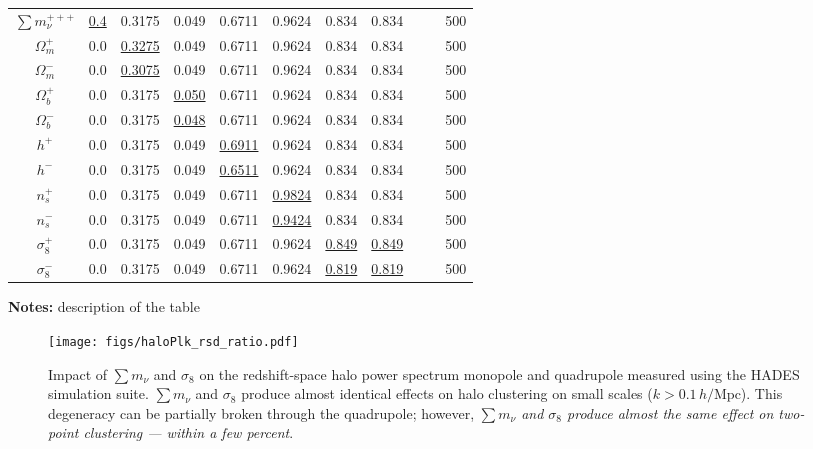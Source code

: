\documentclass[12pt, letterpaper, preprint]{aastex62}
\newcommand{\smnu}{\sum m_\nu}
\newcommand{\sig}{\sigma_8}
\newcommand{\hmpc}{\,h/\mathrm{Mpc}}
\newcommand{\ch}[1]{{\color{orange}{\bf CH:} #1}}
\begin{document}
\begin{table}
\begin{center}
\begin{tabular}{ccccccccccc}
    $\smnu^{+++}$   & \underline{0.4}   & 0.3175 & 0.049 & 0.6711 & 0.9624 & 0.834 & 0.834 & & & 500 \\ 
    $\Omega_m^+$    & 0.0   & \underline{ 0.3275} & 0.049 & 0.6711 & 0.9624 & 0.834 & 0.834 & & & 500 \\ 
    $\Omega_m^-$    & 0.0   & \underline{ 0.3075} & 0.049 & 0.6711 & 0.9624 & 0.834 & 0.834 & & & 500 \\ 
    $\Omega_b^+$    & 0.0   & 0.3175 & \underline{0.050} & 0.6711 & 0.9624 & 0.834 & 0.834 & & & 500 \\ 
    $\Omega_b^-$    & 0.0   & 0.3175 & \underline{0.048} & 0.6711 & 0.9624 & 0.834 & 0.834 & & & 500 \\ 
    $h^+$           & 0.0   & 0.3175 & 0.049 & \underline{0.6911} & 0.9624 & 0.834 & 0.834 & & & 500 \\ 
    $h^-$           & 0.0   & 0.3175 & 0.049 & \underline{0.6511} & 0.9624 & 0.834 & 0.834 & & & 500 \\ 
    $n_s^+$         & 0.0   & 0.3175 & 0.049 & 0.6711 & \underline{0.9824} & 0.834 & 0.834 & & & 500 \\ 
    $n_s^-$         & 0.0   & 0.3175 & 0.049 & 0.6711 & \underline{0.9424} & 0.834 & 0.834 & & & 500 \\ 
    $\sigma_8^+$    & 0.0   & 0.3175 & 0.049 & 0.6711 & 0.9624 & \underline{0.849} & \underline{0.849} & & & 500 \\ 
    $\sigma_8^-$    & 0.0   & 0.3175 & 0.049 & 0.6711 & 0.9624 & \underline{0.819} & \underline{0.819} & & & 500 \\[3pt]
    \hline
\end{tabular} \label{tab:sims}
\end{center}
    {\bf Notes:} \ch{description of the table} 
\end{table}

\begin{figure}
\begin{center}
\texttt{[image: figs/haloPlk\_rsd\_ratio.pdf]}
    \caption{Impact of $\smnu$ and $\sig$ on the redshift-space halo power 
    spectrum monopole and quadrupole measured using the HADES simulation suite. 
    $\smnu$ and $\sig$ produce almost identical effects on halo clustering on 
    small scales ($k > 0.1\hmpc$). This degeneracy can be partially broken 
    through the quadrupole; however, {\em $\smnu$ and $\sig$ produce almost 
    the same effect on two-point clustering --- within a few percent}.
    }
\label{fig:plk}
\end{center}
\end{figure}
\end{document}
